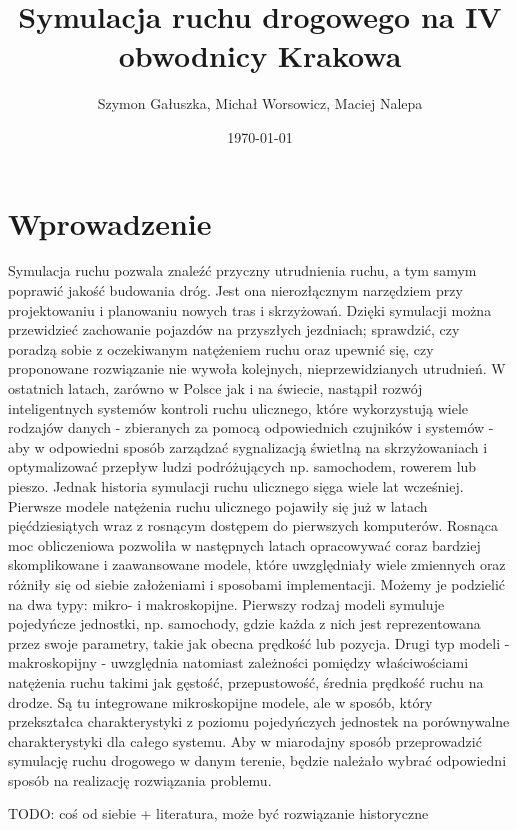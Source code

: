 \documentclass[a4paper,12pt]{article}
\title{Symulacja ruchu drogowego na IV obwodnicy Krakowa}
\author{Szymon Gałuszka, Michał Worsowicz, Maciej Nalepa}
\date{\today}
\begin{document}
	\maketitle
	
	\section{Wprowadzenie}
	Symulacja ruchu pozwala znaleźć przyczny utrudnienia ruchu, a tym samym poprawić jakość budowania dróg. Jest ona nierozłącznym narzędziem przy projektowaniu i planowaniu nowych tras i skrzyżowań. Dzięki symulacji można przewidzieć zachowanie pojazdów na przyszłych jezdniach; sprawdzić, czy poradzą sobie z oczekiwanym natężeniem ruchu oraz upewnić się, czy proponowane rozwiązanie nie wywoła kolejnych, nieprzewidzianych utrudnień. \newline
	W ostatnich latach, zarówno w Polsce jak i na świecie, nastąpił rozwój inteligentnych systemów kontroli ruchu ulicznego, które wykorzystują wiele rodzajów danych - zbieranych za pomocą odpowiednich czujników i systemów - aby w  odpowiedni sposób zarządzać sygnalizacją świetlną na skrzyżowaniach i optymalizować przepływ ludzi podróżujących np. samochodem, rowerem lub pieszo. \newline Jednak historia symulacji ruchu ulicznego sięga wiele lat wcześniej. Pierwsze modele natężenia ruchu ulicznego pojawiły się już w latach pięćdziesiątych wraz z rosnącym dostępem do pierwszych komputerów. Rosnąca moc obliczeniowa pozwoliła w następnych latach opracowywać coraz bardziej skomplikowane i zaawansowane modele, które uwzględniały wiele zmiennych oraz różniły się od siebie założeniami i sposobami implementacji. Możemy je podzielić na dwa typy: mikro- i makroskopijne. Pierwszy rodzaj modeli symuluje pojedyńcze jednostki, np. samochody, gdzie każda z nich jest reprezentowana przez swoje parametry, takie jak obecna prędkość lub pozycja. Drugi typ modeli - makroskopijny - uwzględnia natomiast zależności pomiędzy właściwościami natężenia ruchu takimi jak gęstość, przepustowość, średnia prędkość ruchu na drodze. Są tu integrowane mikroskopijne modele, ale w sposób, który przekształca charakterystyki z poziomu pojedyńczych jednostek na porównywalne charakterystyki dla całego systemu. Aby w miarodajny sposób przeprowadzić symulację ruchu drogowego w danym terenie,  będzie należało wybrać odpowiedni sposób na realizację rozwiązania problemu.
	
	TODO: coś od siebie + literatura, może być rozwiązanie historyczne
	
\end{document}
